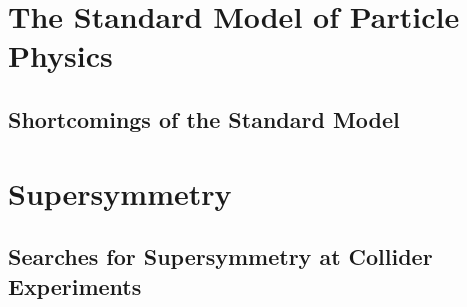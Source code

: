 \section{The Standard Model of Particle Physics}
\label{sec:sm}

\subsection{Shortcomings of the Standard Model}
\label{subsec:sm_shortcomings}

\section{Supersymmetry}
\label{sec:susy}

\subsection{Searches for Supersymmetry at Collider Experiments}
\label{subsec:susy_status}



